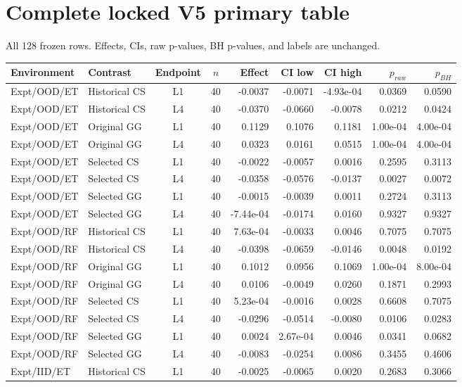 \documentclass[9pt]{article}
\begin{document}
\section{Complete locked V5 primary table}
All 128 frozen rows. Effects, CIs, raw p-values, BH p-values, and labels are unchanged.
\scriptsize
\begin{longtable}{p{2.0cm}p{1.35cm}ccrrrrr}
\toprule
Environment & Contrast & Endpoint & $n$ & Effect & CI low & CI high & $p_{raw}$ & $p_{BH}$\\\midrule\endhead
Expt/OOD/ET & Historical CS & L1 & 40 & -0.0037 & -0.0071 & -4.93e-04 & 0.0369 & 0.0590\\
Expt/OOD/ET & Historical CS & L4 & 40 & -0.0370 & -0.0660 & -0.0078 & 0.0212 & 0.0424\\
Expt/OOD/ET & Original GG & L1 & 40 & 0.1129 & 0.1076 & 0.1181 & 1.00e-04 & 4.00e-04\\
Expt/OOD/ET & Original GG & L4 & 40 & 0.0323 & 0.0161 & 0.0515 & 1.00e-04 & 4.00e-04\\
Expt/OOD/ET & Selected CS & L1 & 40 & -0.0022 & -0.0057 & 0.0016 & 0.2595 & 0.3113\\
Expt/OOD/ET & Selected CS & L4 & 40 & -0.0358 & -0.0576 & -0.0137 & 0.0027 & 0.0072\\
Expt/OOD/ET & Selected GG & L1 & 40 & -0.0015 & -0.0039 & 0.0011 & 0.2724 & 0.3113\\
Expt/OOD/ET & Selected GG & L4 & 40 & -7.44e-04 & -0.0174 & 0.0160 & 0.9327 & 0.9327\\
Expt/OOD/RF & Historical CS & L1 & 40 & 7.63e-04 & -0.0033 & 0.0046 & 0.7075 & 0.7075\\
Expt/OOD/RF & Historical CS & L4 & 40 & -0.0398 & -0.0659 & -0.0146 & 0.0048 & 0.0192\\
Expt/OOD/RF & Original GG & L1 & 40 & 0.1012 & 0.0956 & 0.1069 & 1.00e-04 & 8.00e-04\\
Expt/OOD/RF & Original GG & L4 & 40 & 0.0106 & -0.0049 & 0.0260 & 0.1871 & 0.2993\\
Expt/OOD/RF & Selected CS & L1 & 40 & 5.23e-04 & -0.0016 & 0.0028 & 0.6608 & 0.7075\\
Expt/OOD/RF & Selected CS & L4 & 40 & -0.0296 & -0.0514 & -0.0080 & 0.0106 & 0.0283\\
Expt/OOD/RF & Selected GG & L1 & 40 & 0.0024 & 2.67e-04 & 0.0046 & 0.0341 & 0.0682\\
Expt/OOD/RF & Selected GG & L4 & 40 & -0.0083 & -0.0254 & 0.0086 & 0.3455 & 0.4606\\
Expt/IID/ET & Historical CS & L1 & 40 & -0.0025 & -0.0065 & 0.0020 & 0.2683 & 0.3066\\

\end{longtable}
\end{document}
